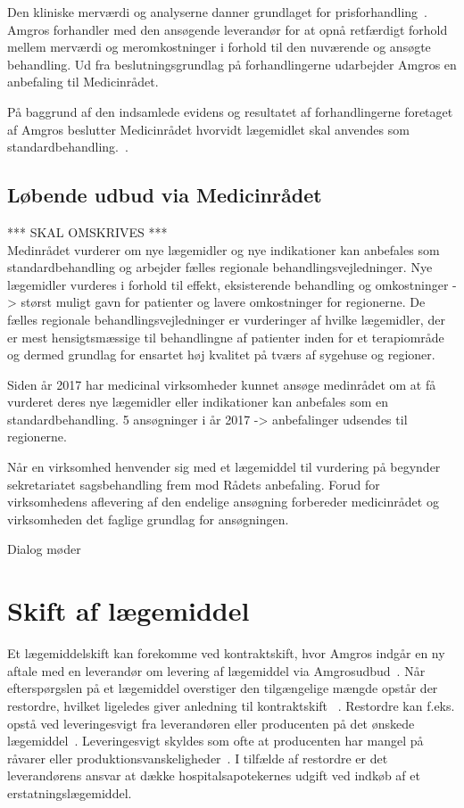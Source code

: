 Den kliniske merværdi og analyserne danner grundlaget for prisforhandling~\citep{Amgros2017, Amgros2017a}. Amgros forhandler med den ansøgende leverandør for at opnå retfærdigt forhold mellem merværdi og meromkostninger i forhold til den nuværende og ansøgte behandling. Ud fra beslutningsgrundlag på forhandlingerne udarbejder Amgros en anbefaling til Medicinrådet.~\citep{Amgros2017, Amgros2017a}

På baggrund af den indsamlede evidens og resultatet af forhandlingerne foretaget af Amgros beslutter Medicinrådet hvorvidt lægemidlet skal anvendes som standardbehandling.~\citep{Amgros2017a}. 

\subsection{Løbende udbud via Medicinrådet}
*** SKAL OMSKRIVES *** \\
Medinrådet vurderer om  nye lægemidler og nye indikationer kan anbefales som standardbehandling og arbejder fælles regionale behandlingsvejledninger. Nye lægemidler vurderes i forhold til effekt, eksisterende behandling og omkostninger -> størst muligt gavn for patienter og lavere omkostninger for regionerne. De fælles regionale behandlingsvejledninger er vurderinger af hvilke lægemidler, der er mest hensigtsmæssige til behandlingne af patienter inden for et terapiområde og dermed grundlag for ensartet høj kvalitet på tværs af sygehuse og regioner. 


Siden år 2017 har medicinal virksomheder kunnet ansøge medinrådet om at få vurderet deres nye lægemidler eller indikationer kan anbefales som en standardbehandling. 5 ansøgninger i år 2017 -> anbefalinger udsendes til regionerne. 


Når en virksomhed henvender sig med et lægemiddel til vurdering på begynder sekretariatet sagsbehandling frem mod Rådets anbefaling. Forud for virksomhedens aflevering af den endelige ansøgning forbereder medicinrådet og virksomheden det faglige grundlag for ansøgningen. 

Dialog møder

\section{Skift af lægemiddel}
Et lægemiddelskift kan forekomme ved kontraktskift, hvor Amgros indgår en ny aftale med en leverandør om levering af lægemiddel via Amgrosudbud~\citep{Amgros2017a}. Når efterspørgslen på et lægemiddel overstiger den tilgængelige mængde opstår der restordre, hvilket ligeledes giver anledning til kontraktskift ~\citep{Amgros2015}. Restordre kan f.eks. opstå ved leveringesvigt fra leverandøren eller producenten på det ønskede lægemiddel~\citep{Amgros2017, Laegemiddelinformaion2017}. Leveringesvigt skyldes som ofte at producenten har mangel på råvarer eller produktionsvanskeligheder~\citep{Amgros2017, Laegemiddelinformaion2017}. I tilfælde  af restordre er det leverandørens ansvar at dække hospitalsapotekernes udgift ved indkøb af et erstatningslægemiddel.

